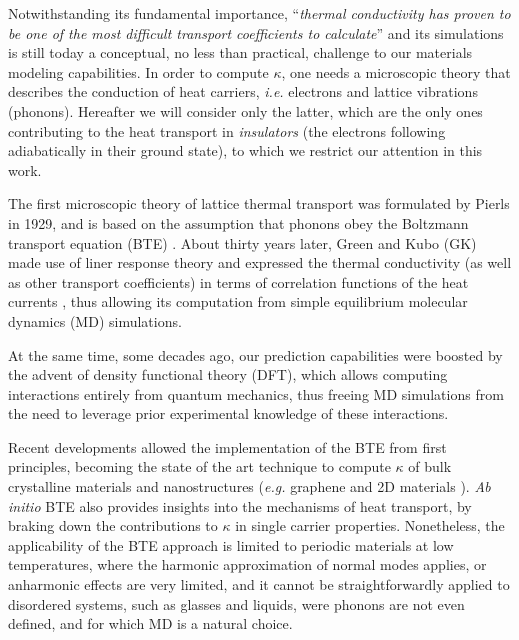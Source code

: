 Notwithstanding its fundamental importance, ``\emph{thermal conductivity has proven to be one of the most difficult transport coefficients to calculate}'' \cite{Evans1990} and its simulations is still today a conceptual, no less than practical, challenge to our materials modeling capabilities. 
In order to compute $\kappa$, one needs a microscopic theory that describes the conduction of heat carriers, \emph{i.e.} electrons and lattice vibrations (phonons). Hereafter we will consider only the latter, which are the only ones contributing to the heat transport in \emph{insulators} (the electrons following adiabatically in their ground state), to which we restrict our attention in this work. 

The first microscopic theory of lattice thermal transport was formulated by Pierls in 1929, and is based on the assumption that phonons obey the Boltzmann transport equation (BTE) \cite{Peierls1929}. 
About thirty years later, Green and Kubo (GK) made use of liner response theory and expressed the thermal conductivity (as well as other transport coefficients) in terms of correlation functions of the heat currents \cite{Green1952,Green1954,Kubo1957a,Kubo1957b,Zwanzig1965}, thus allowing its computation from simple equilibrium molecular dynamics (MD) simulations. 

At the same time, some decades ago, our prediction capabilities were boosted by the advent of density functional theory (DFT), which allows computing interactions entirely from quantum mechanics, thus freeing MD simulations from the need to leverage prior experimental knowledge of these interactions. 

Recent developments allowed the implementation of the BTE from first principles, becoming the state of the art technique to compute $\kappa$ of bulk crystalline materials  and nanostructures (\emph{e.g.} graphene and 2D materials \LE{[]Fugallo]}). \emph{Ab initio} BTE also provides insights into the mechanisms of heat transport, by braking down the contributions to $\kappa$ in single carrier properties. 
Nonetheless, the applicability of the BTE approach is limited to periodic materials at low temperatures, where the harmonic approximation of normal modes applies, or anharmonic effects are very limited, and it cannot be straightforwardly applied to disordered systems, such as glasses and liquids, were phonons are not even defined, and for which MD is a natural choice. 





